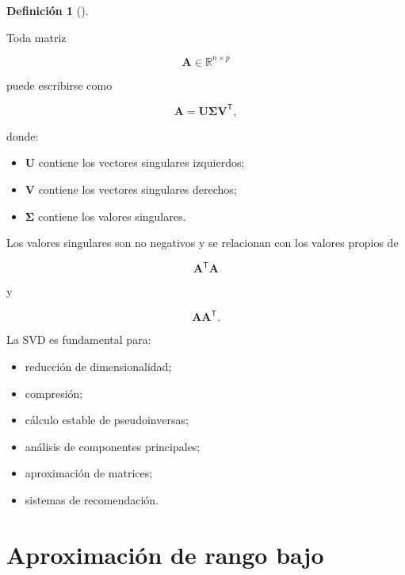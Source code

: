 \documentclass[
  spanish,
  10.5pt,
  letterpaper,
  DIV=11,
  numbers=noendperiod,
  oneside,
  open=any]{scrreprt}
\providecommand{\tightlist}{%
  \setlength{\itemsep}{0pt}\setlength{\parskip}{0pt}}
\theoremstyle{definition}
\newtheorem{definition}{Definición}[chapter]
\theoremstyle{definition}
\theoremstyle{plain}
\theoremstyle{remark}
\begin{document}

\begin{definition}[]\protect\hypertarget{def-svd}{}\label{def-svd}

Toda matriz

\[
\mathbf{A}\in\mathbb{R}^{n\times p}
\]

puede escribirse como

\[
\mathbf{A}
=
\mathbf{U}
\boldsymbol{\Sigma}
\mathbf{V}^{\mathsf T},
\]

donde:

\begin{itemize}
\tightlist
\item
  \(\mathbf{U}\) contiene los vectores singulares izquierdos;
\item
  \(\mathbf{V}\) contiene los vectores singulares derechos;
\item
  \(\boldsymbol{\Sigma}\) contiene los valores singulares.
\end{itemize}

\end{definition}

Los valores singulares son no negativos y se relacionan con los valores
propios de

\[
\mathbf{A}^{\mathsf T}\mathbf{A}
\]

y

\[
\mathbf{A}\mathbf{A}^{\mathsf T}.
\]

La SVD es fundamental para:

\begin{itemize}
\tightlist
\item
  reducción de dimensionalidad;
\item
  compresión;
\item
  cálculo estable de pseudoinversas;
\item
  análisis de componentes principales;
\item
  aproximación de matrices;
\item
  sistemas de recomendación.
\end{itemize}

\section*{Aproximación de rango
bajo}\label{aproximaciuxf3n-de-rango-bajo}

\end{document}
